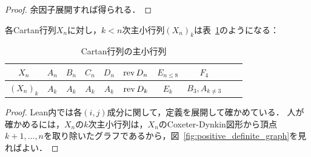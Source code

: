 \begin{proof}
  余因子展開すれば得られる．
\end{proof}

\begin{lemma}
  \label{lem:CartanMatrix.A_leadingSubmatrix}
  \leanok
  各Cartan行列$X_n$に対し，$k < n$次主小行列$(X_n)_k$は表~\ref{table:CartanMatrix.A_leadingSubmatrix}のようになる：
  \begin{table}[htbp]
    \centering
    \caption{Cartan行列の主小行列}
    \label{table:CartanMatrix.A_leadingSubmatrix}
    \begin{tabular}{c|ccccccccc}
      $X_n$ & $A_n$ & $B_n$ & $C_n$ & $D_n$ & $\operatorname{rev} D_n$ & $E_{n \le 8}$ & $F_4$ \\ \hline
      $(X_n)_k$ & $A_k$ & $A_k$ & $A_k$ & $A_k$ & $\operatorname{rev} D_k$ & $E_k$ & $B_3, A_{k \ne 3}$
    \end{tabular}
  \end{table}
\end{lemma}

\begin{proof}
  Lean内では各$(i, j)$成分に関して，定義を展開して確かめている．
  人が確かめるには，$X_n$の$k$次主小行列は，$X_n$のCoxeter-Dynkin図形から頂点$k+1, \ldots, n$を取り除いたグラフであるから，図~\ref{fig:positive_definite_graph}を見ればよい．
\end{proof}